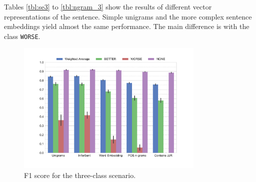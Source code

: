 Tables \ref{tbl:se3} to \ref{tbl:ngram_3} show the results of different vector representations of the sentence. Simple unigrams and the more complex sentence embeddings yield almost the same performance. The main difference is with the class \texttt{WORSE}.


\begin{figure}[h]
      \caption{F1 score for the three-class scenario.} 
    \label{tbl:3_conf_inf}
 \centering
	\includegraphics[width=0.8\textwidth]{images/experiments/f1-False}

\end{figure}

